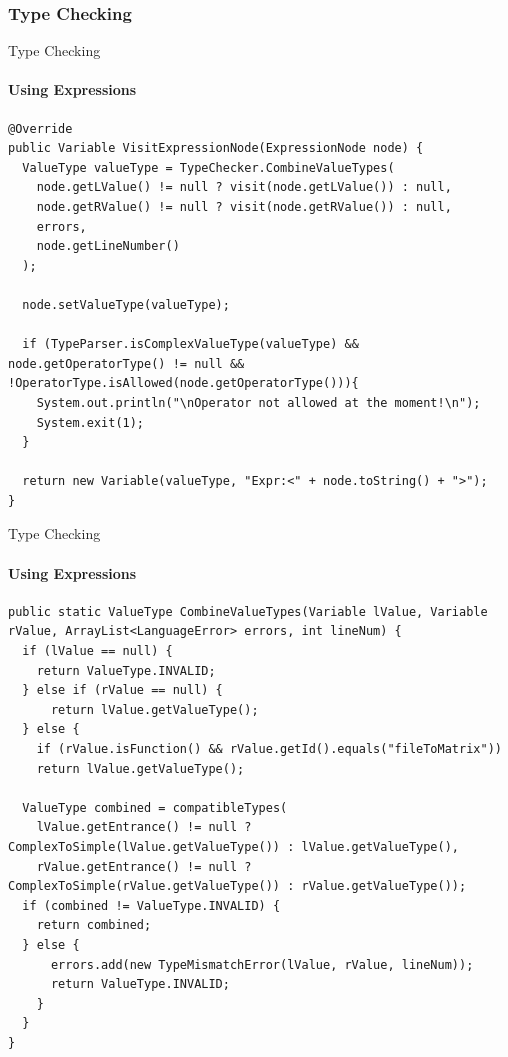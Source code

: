 \subsubsection{Type Checking}
\begin{frame}[fragile]{Type Checking}
\framesubtitle{Using Expressions}


\begin{lstlisting}[caption=The visit method for visiting a ExpressionNode in the Type checker. ,frame=tlrb, basicstyle=\tiny, numbers=none]
@Override
public Variable VisitExpressionNode(ExpressionNode node) {
  ValueType valueType = TypeChecker.CombineValueTypes(
    node.getLValue() != null ? visit(node.getLValue()) : null,
    node.getRValue() != null ? visit(node.getRValue()) : null,
    errors,
    node.getLineNumber()
  );

  node.setValueType(valueType);

  if (TypeParser.isComplexValueType(valueType) && node.getOperatorType() != null && !OperatorType.isAllowed(node.getOperatorType())){
    System.out.println("\nOperator not allowed at the moment!\n");
    System.exit(1);
  }

  return new Variable(valueType, "Expr:<" + node.toString() + ">");
}
\end{lstlisting}

\end{frame}

\begin{frame}[fragile]{Type Checking}
\framesubtitle{Using Expressions}

\begin{lstlisting}[caption=The method checking if two types are compatible according to the specification of GAMBL ,frame=tlrb, basicstyle=\tiny, numbers=none]
public static ValueType CombineValueTypes(Variable lValue, Variable rValue, ArrayList<LanguageError> errors, int lineNum) {
  if (lValue == null) {
    return ValueType.INVALID;
  } else if (rValue == null) {
      return lValue.getValueType();
  } else {
    if (rValue.isFunction() && rValue.getId().equals("fileToMatrix"))
    return lValue.getValueType();
    
  ValueType combined = compatibleTypes(
    lValue.getEntrance() != null ? ComplexToSimple(lValue.getValueType()) : lValue.getValueType(),
    rValue.getEntrance() != null ? ComplexToSimple(rValue.getValueType()) : rValue.getValueType());
  if (combined != ValueType.INVALID) {
    return combined;
  } else {
      errors.add(new TypeMismatchError(lValue, rValue, lineNum));
      return ValueType.INVALID;
    }
  }
}
\end{lstlisting}

\end{frame}

